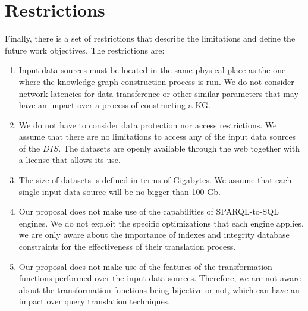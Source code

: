 \section{Restrictions}
Finally, there is a set of restrictions that describe the limitations and define the future work objectives. The restrictions are:

\begin{enumerate}[label=\textbf{R{\arabic*}}]
    \item Input data sources must be located in the same physical place as the one where the knowledge graph construction process is run. We do not consider network latencies for data transference or other similar parameters that may have an impact over a process of constructing a KG. 
    \item We do not have to consider data protection nor access restrictions. We assume that there are no limitations to access any of the input data sources of the $DIS$. The datasets are openly available through the web together with a license that allows its use.
    \item The size of datasets is defined in terms of Gigabytes. We assume that each single input data source will be no bigger than 100 Gb.
    \item Our proposal does not make use of the capabilities of SPARQL-to-SQL engines. We do not exploit the specific optimizations that each engine applies, we are only aware about the importance of indexes and integrity database constraints for the effectiveness of their translation process.
    \item Our proposal does not make use of the features of the transformation functions performed over the input data sources. Therefore, we are not aware about  the transformation functions being bijective or not, which can have an impact over query translation techniques.  
\end{enumerate}




